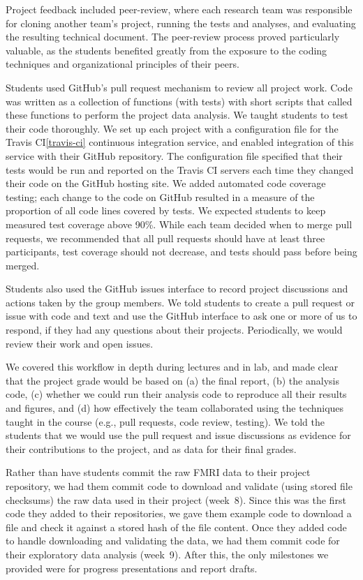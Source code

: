 Project feedback included peer-review, where each research team was
responsible for cloning another team's project, running the tests and
analyses, and evaluating the resulting technical document.
The peer-review process proved particularly valuable, as the students 
benefited greatly from the exposure to the coding techniques and 
organizational principles of their peers.

Students used GitHub's pull request mechanism to review all project work.
Code was written as a collection of functions (with tests) with short
scripts that called these functions to perform the project data analysis.
We taught students to test their code thoroughly.
We set up each project with a configuration file for the Travis
CI\cref{travis-ci} continuous integration service, and enabled integration of
this service with their GitHub repository.  The configuration file specified
that their tests would be run and reported on the Travis CI servers each
time they changed their code on the GitHub hosting site.
We added automated code coverage testing; each change to the code on GitHub
resulted in a measure of the proportion of all code lines covered by tests.
We expected students to keep measured test coverage above 90\%.
While each team decided when to merge pull requests, we recommended that
all pull requests should have at least three participants, test coverage
should not decrease, and tests should pass before being merged.

Students also used the GitHub issues interface to record project discussions
and actions taken by the group members.
We told students to create a pull request
or issue with code and text and use the GitHub interface to ask one or more
of us to respond, if they had any questions about their projects.
Periodically, we would review their work and open issues.

We covered this workflow in depth during lectures and in lab,
and made clear that the project grade would be based on
(a) the final report,
(b) the analysis code,
(c) whether we could run their analysis code to reproduce all
their results and figures, and
(d) how effectively the team collaborated using the techniques
taught in the course (e.g., pull requests, code review, testing).
We told the students that we would use the pull request and issue
discussions as evidence for their contributions to the project, and as data for
their final grades.

Rather than have students commit the raw FMRI data to their project repository, we had
them commit code to download and validate (using stored file checksums)
the raw data used in their project (week~8).
Since this was the first code they added to their repositories, we gave them example
code to download a file and check it against a stored hash of the file
content.
Once they added code to handle downloading and validating the data,
we had them commit code for their exploratory data analysis (week~9).
After this, the only milestones we provided were for progress
presentations and report drafts.

